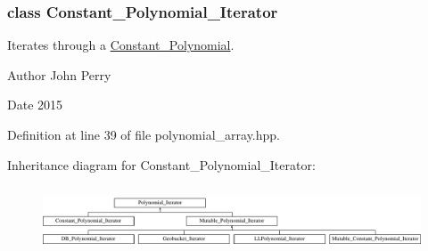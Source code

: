 \subsubsection{class Constant\+\_\+\+Polynomial\+\_\+\+Iterator}
Iterates through a \hyperlink{group__polygroup_class_constant___polynomial}{Constant\+\_\+\+Polynomial}. 

\begin{DoxyAuthor}{Author}
John Perry 
\end{DoxyAuthor}
\begin{DoxyDate}{Date}
2015 
\end{DoxyDate}


Definition at line 39 of file polynomial\+\_\+array.\+hpp.

Inheritance diagram for Constant\+\_\+\+Polynomial\+\_\+\+Iterator\+:\begin{figure}[H]
\begin{center}
\leavevmode
\includegraphics[height=2.000000cm]{group___iterator_group}
\end{center}
\end{figure}
